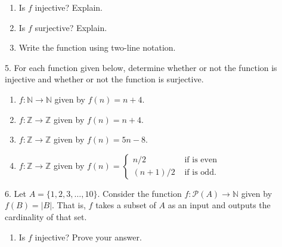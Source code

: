 \documentclass[10pt,]{memoir}
\theoremstyle{plain}
\theoremstyle{definition}
\theoremstyle{definition}
\theoremstyle{definition}
\numberwithin{equation}{chapter}
\def\N{\mathbb N}
\def\Z{\mathbb Z}
\def\pow{\mathcal P}
\newcommand{\amp}{ & }
\begin{document}
\begin{exerciselist}
\begin{figure}
{
}
\end{figure}
\leavevmode%
\begin{enumerate}[label=(\alph*)]
\item\hypertarget{li-306}{}
                Is \(f\) injective? Explain.
\item\hypertarget{li-307}{}
                Is \(f\) surjective? Explain.
\item\hypertarget{li-308}{}
                Write the function using two-line notation.
\end{enumerate}
\par\smallskip
\item[5.]\hypertarget{exercise-31}{}
            For each function given below, determine whether or not the function is injective and whether or not the function is surjective.
\leavevmode%
\begin{enumerate}[label=(\alph*)]
\item\hypertarget{li-312}{}\(f:\N \to \N\) given by \(f(n) = n+4\).\item\hypertarget{li-313}{}\(f:\Z \to \Z\) given by \(f(n) = n+4\).\item\hypertarget{li-314}{}\(f:\Z \to \Z\) given by \(f(n) = 5n - 8\).\item\hypertarget{li-315}{}\(f:\Z \to \Z\) given by \(f(n) = \begin{cases}n/2 \amp  \mbox{ if  is even} \\ (n+1)/2 \amp \mbox{ if  is odd} . \end{cases}
              \)\end{enumerate}
\par\smallskip
\item[6.]\hypertarget{exercise-32}{}
            Let \(A = \{1,2,3,\ldots,10\}\). Consider the function \(f:\pow(A) \to \N\) given by \(f(B) = |B|\). That is, \(f\) takes a subset of \(A\) as an input and outputs the cardinality of that set.
\leavevmode%
\begin{enumerate}[label=(\alph*)]
\item\hypertarget{li-320}{}
                Is \(f\) injective? Prove your answer.

\end{enumerate}
\end{exerciselist}
\end{document}
